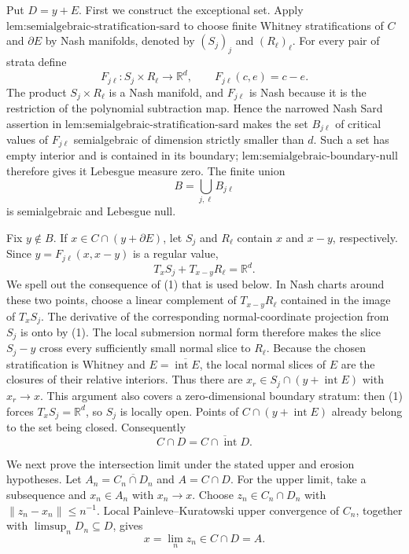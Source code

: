 Put \(D=y+E\).  First we construct the exceptional set.  Apply \(\text{lem:semialgebraic-stratification-sard}\) to choose finite Whitney stratifications of \(C\) and \(\partial E\) by Nash manifolds, denoted by \((S_j)_j\) and \((R_\ell)_\ell\).  For every pair of strata define
\[
 F_{j\ell}:S_j\times R_\ell\longrightarrow\mathbb R^d,
 \qquad F_{j\ell}(c,e)=c-e.
\]
The product \(S_j\times R_\ell\) is a Nash manifold, and \(F_{j\ell}\) is Nash because it is the restriction of the polynomial subtraction map.  Hence the narrowed Nash Sard assertion in \(\text{lem:semialgebraic-stratification-sard}\) makes the set \(B_{j\ell}\) of critical values of \(F_{j\ell}\) semialgebraic of dimension strictly smaller than \(d\).  Such a set has empty interior and is contained in its boundary; \(\text{lem:semialgebraic-boundary-null}\) therefore gives it Lebesgue measure zero.  The finite union
\[
 B=\bigcup_{j,\ell}B_{j\ell}
\]
is semialgebraic and Lebesgue null.

Fix \(y\notin B\).  If \(x\in C\cap(y+\partial E)\), let \(S_j\) and \(R_\ell\) contain \(x\) and \(x-y\), respectively.  Since \(y=F_{j\ell}(x,x-y)\) is a regular value,
\[
 T_xS_j+T_{x-y}R_\ell=\mathbb R^d. \tag{1}
\]
We spell out the consequence of (1) that is used below.  In Nash charts around these two points, choose a linear complement of \(T_{x-y}R_\ell\) contained in the image of \(T_xS_j\).  The derivative of the corresponding normal-coordinate projection from \(S_j\) is onto by (1).  The local submersion normal form therefore makes the slice \(S_j-y\) cross every sufficiently small normal slice to \(R_\ell\).  Because the chosen stratification is Whitney and \(E=\overline{\operatorname{int}E}\), the local normal slices of \(E\) are the closures of their relative interiors.  Thus there are \(x_r\in S_j\cap(y+\operatorname{int}E)\) with \(x_r\to x\).  This argument also covers a zero-dimensional boundary stratum: then (1) forces \(T_xS_j=\mathbb R^d\), so \(S_j\) is locally open.  Points of \(C\cap(y+\operatorname{int}E)\) already belong to the set being closed.  Consequently
\[
 C\cap D=\overline{C\cap\operatorname{int}D}. \tag{2}
\]

We next prove the intersection limit under the stated upper and erosion hypotheses.  Let
\(A_n=\overline{C_n\cap D_n}\) and \(A=C\cap D\).  For the upper limit, take a subsequence and \(x_n\in A_n\) with \(x_n\to x\).  Choose \(z_n\in C_n\cap D_n\) with \(\lVert z_n-x_n\rVert\le n^{-1}\).  Local Painleve--Kuratowski upper convergence of \(C_n\), together with \(\limsup_nD_n\subseteq D\), gives
\[
 x=\lim_nz_n\in C\cap D=A. \tag{3}
\]

